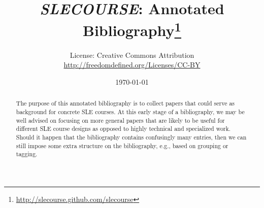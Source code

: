 \documentclass[12pt]{article}
\begin{document}
\title{\emph{SLECOURSE}: Annotated Bibliography\thanks{\url{http://slecourse.github.com/slecourse}}}

\author{License:  Creative Commons Attribution\\\url{http://freedomdefined.org/Licenses/CC-BY}}

\date{\today}

\maketitle

\begin{abstract}
The purpose of this annotated bibliography is to collect papers that could serve as background for concrete SLE courses. At this early stage of a bibliography, we may be well advised on focusing on more general papers that are likely to be useful for different SLE course designs as opposed to highly technical and specialized work. Should it happen that the bibliography contains confusingly many entries, then we can still impose some extra structure on the bibliography, e.g., based on grouping or tagging.
\end{abstract}

\nocite{*}



\end{document}
